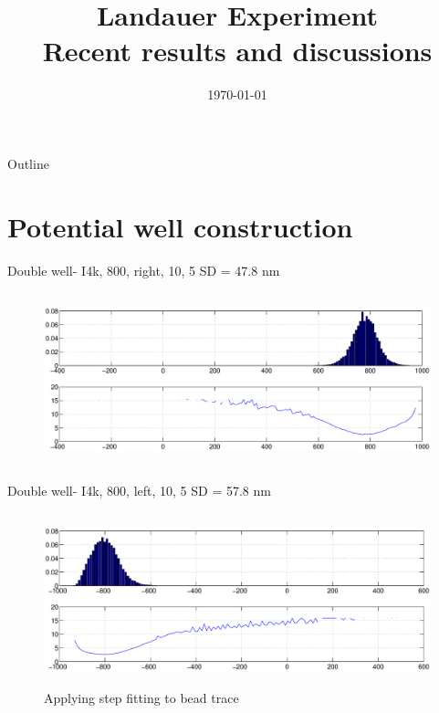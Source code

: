 \documentclass{beamer}
\title[Recent results and discussions] %
{Landauer Experiment \\Recent results and discussions}
\institute[U of M] %
{
 Department of Electrical Engineering\\
 University of Minnesota\\
}
\date{\today}
\begin{document}
\begin{frame}
  \titlepage
\end{frame}

\begin{frame}{Outline}
  \tableofcontents  %
\end{frame}

\section{Potential well construction}
\begin{frame}{Double well- I4k, 800, right, 10, 5} 
SD = 47.8 nm
\begin{figure}
    \centering
    \includegraphics[height=5cm,width=12cm]{right_well_I4k_800.eps}
    \label{fig:graph1}
\end{figure}


\end{frame}

\begin{frame}{Double well- I4k, 800, left, 10, 5} 
SD = 57.8 nm
\begin{figure}
    \centering
    \includegraphics[height=5cm,width=12cm]{left_well_I4k_800.eps}
    \caption{Applying step fitting to bead trace}
    \label{fig:graph2}
\end{figure}


\end{frame}
\end{document}
